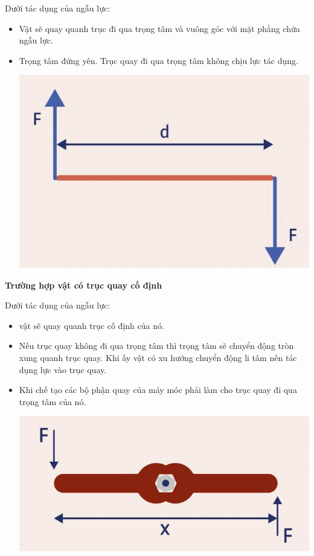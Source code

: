 Dưới tác dụng của ngẫu lực:
\begin{itemize}
	\item  Vật sẽ quay quanh trục đi qua trọng tâm và vuông góc với mặt phẳng chứa ngẫu lực.
	\item Trọng tâm đứng yên. Trục quay đi qua trọng tâm không chịu lực tác dụng.
	\begin{center}
		\includegraphics[scale=0.4]{../figs/VN10-PH-25-L-020-1-V2-01.JPG}
	\end{center}	
\end{itemize}
\textbf{Trường hợp vật có trục quay cố định}

Dưới tác dụng của ngẫu lực:
\begin{itemize}
	\item  vật sẽ quay quanh trục cố định của nó. 
	\item Nếu trục quay không đi qua trọng tâm thì trọng tâm sẽ chuyển động tròn xung quanh trục quay. Khi ấy vật có xu hướng chuyển động li tâm nên tác dụng lực vào trục quay.
	\item Khi chế tạo các bộ phận quay của máy móc phải làm cho trục quay đi qua trọng tâm của nó.
	\begin{center}
		\includegraphics[scale=0.4]{../figs/VN10-PH-25-L-020-1-V2-02.JPG}
	\end{center}
\end{itemize}

